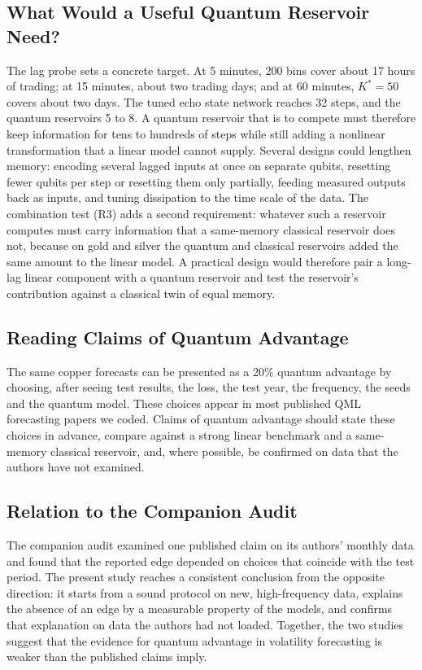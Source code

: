 \documentclass{ieeeaccess}
\begin{document}
\subsection{What Would a Useful Quantum Reservoir Need?}
The lag probe sets a concrete target. At 5 minutes, 200 bins cover about 17 hours of trading; at 15 minutes, about two trading days; and at 60 minutes, $K^*=50$ covers about two days. The tuned echo state network reaches 32 steps, and the quantum reservoirs 5 to 8. A quantum reservoir that is to compete must therefore keep information for tens to hundreds of steps while still adding a nonlinear transformation that a linear model cannot supply. Several designs could lengthen memory: encoding several lagged inputs at once on separate qubits, resetting fewer qubits per step or resetting them only partially, feeding measured outputs back as inputs, and tuning dissipation to the time scale of the data. The combination test (R3) adds a second requirement: whatever such a reservoir computes must carry information that a same-memory classical reservoir does not, because on gold and silver the quantum and classical reservoirs added the same amount to the linear model. A practical design would therefore pair a long-lag linear component with a quantum reservoir and test the reservoir's contribution against a classical twin of equal memory.

\subsection{Reading Claims of Quantum Advantage}
The same copper forecasts can be presented as a 20\% quantum advantage by choosing, after seeing test results, the loss, the test year, the frequency, the seeds and the quantum model. These choices appear in most published QML forecasting papers we coded. Claims of quantum advantage should state these choices in advance, compare against a strong linear benchmark and a same-memory classical reservoir, and, where possible, be confirmed on data that the authors have not examined.

\subsection{Relation to the Companion Audit}
The companion audit \cite{companion} examined one published claim on its authors' monthly data and found that the reported edge depended on choices that coincide with the test period. The present study reaches a consistent conclusion from the opposite direction: it starts from a sound protocol on new, high-frequency data, explains the absence of an edge by a measurable property of the models, and confirms that explanation on data the authors had not loaded. Together, the two studies suggest that the evidence for quantum advantage in volatility forecasting is weaker than the published claims imply.
\end{document}

